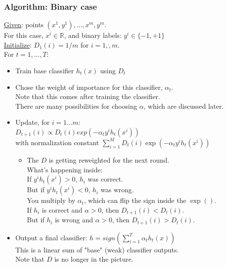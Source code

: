 \subsubsection{Algorithm: Binary case}
\underline{Given}: points $(x^1, y^1), \dots, x^m, y^m$.  \hfill \\
For this case, $x^i \in \mathbb{R}$, and binary labels: $y^i \in \{-1, +1\}$ \hfill \\
\underline{Initialize}: $D_1(i) = 1/m$ for $i=1, \dot, m$.  \hfill \\
For $t = 1, \dots, T:$
\begin{itemize}
	\item Train base classifier $h_t(x)$ using $D_t$
	\item Chose the weight of importance for this classifier, $\alpha_t$. \hfill \\
		Note that this comes after training the classifier.  \hfill \\
		There are many possibilities for choosing $\alpha$, which are discussed later.  \hfill \\
	\item Update, for $i= 1 \dots m$:  \hfill \\
		$D_{t+1}(i) \propto D_t(i) exp(-\alpha_t y^i h_t(x^i))$ \hfill \\
				with normalization constant $\displaystyle \sum_{i=1}^M D_t(i) \exp(-\alpha_t y^i h_t(x^i))$ 
		\begin{itemize}
			\item The $D$ is getting reweighted for the next round.  \hfill \\
			What's happening inside: \hfill \\
			If $y^i h_t(x^i) > 0$, $h_i$ was correct.  \hfill \\
			But if $y^i h_t(x^i) < 0$, $h_i$ was wrong.  \hfill \\
			You multiply by $\alpha_t$, which can flip the sign inside the $\exp()$. \hfill \\
			If $h_i$ is correct and $\alpha > 0$, then $D_{t+1}(i) < D_t(i)$.  \hfill \\
			But if $h_i$ is wrong and $\alpha > 0$, then $D_{t+1}(i) > D_t(i)$.  \hfill \\
		\end{itemize}
	\item Output a final classifier: $\displaystyle h = sign \left( \sum_{i=1}^T \alpha_t h_t(x) \right)$ \hfill \\
		This is a linear sum of "base" (weak) classifier outputs. \hfill \\
		Note that $D$ is no longer in the picture. 		
\end{itemize}


